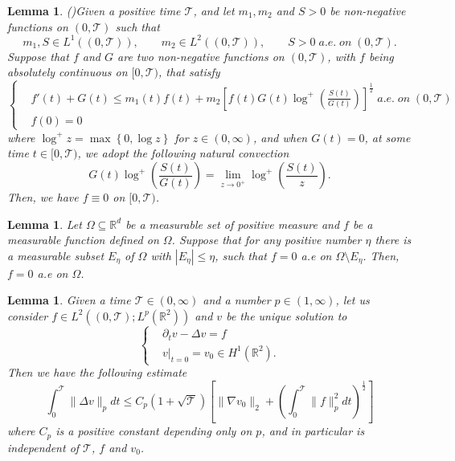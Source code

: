 \documentclass[11pt, a4paper, article,reqno,]{amsart}
\newtheorem{lemma}[theorem]{Lemma}
\theoremstyle{remark}
\numberwithin{equation}{section}
\begin{document}
\begin{lemma}(\cite{LT})\label{lemma_uniqueness}
    Given a positive time $\mathcal{T}$, and let $m_1,m_2$ and $S>0$ be non-negative functions on $(0,\mathcal{T})$ such that
    \begin{equation*}
        m_1, S \in L^1((0,\mathcal{T})), \qquad m_2 \in L^2((0,\mathcal{T})), \qquad S>0 \; a.e. \; on \; (0,\mathcal{T}).
    \end{equation*}
    Suppose that $f$ and $G$ are two non-negative functions on $(0,\mathcal{T})$, with $f$ being absolutely continuous on $[0,\mathcal{T})$, that satisfy
    \begin{equation*}
         \left\{ \begin{aligned}
             & f'(t) + G(t) \leq m_1(t)f(t) + m_2\left[f(t) G(t) \log^+ \left( \frac{S(t)}{G(t)}\right) \right]^{\frac{1}{2}} \; a.e. \; on \; (0,\mathcal{T}) \\
             &f(0)=0
         \end{aligned} \right.
    \end{equation*}
    where $\log^+z = \max\left\{0, \log z\right\}$ for $z \in (0,\infty)$, and when $G(t)=0$, at some time $t \in [0,\mathcal{T})$, we adopt the following natural convection
    \begin{equation}
        G(t)\log^+ \left( \frac{S(t)}{G(t)} \right) = \lim_{z \rightarrow0^+}\log^+ \left( \frac{S(t)}{z}\right).
    \end{equation}
    Then, we have $f \equiv 0$ on $[0,\mathcal{T})$.
\end{lemma}

\begin{lemma}\label{egoroff}
    Let $\Omega \subseteq \mathbb{R}^d$ be a measurable set of positive measure and $f$ be a measurable function defined on $\Omega$. Suppose that for any positive number $\eta$ there is a measurable subset $E_\eta$ of $\Omega$ with $|E_\eta| \leq \eta$, such that $f=0$ a.e on $\Omega \setminus E_\eta$. Then, $f=0$ a.e on $\Omega$.
\end{lemma}

\begin{lemma}\label{A3}
Given a time $\mathcal{T} \in (0,\infty)$ and a number $p \in (1, \infty)$, let us consider $f \in L^2((0,\mathcal{T});L^p(\mathbb{R}^2))$ and $v$ be the unique solution to
\begin{equation*}
    \left\{ \begin{aligned}
        & \partial_t v - \Delta v = f \\
        & v|_{t=0} = v_0 \in H^1(\mathbb{R}^2).
    \end{aligned} \right.
\end{equation*}
Then we have the following estimate
\begin{equation*}
    \int_0^\mathcal{T} \|\Delta v\|_p dt \leq C_p( 1 + \sqrt{\mathcal{T}}) \left[ \|\nabla v_0\|_2 + \left( \int_0^\mathcal{T} \|f\|_p^2 dt\right)^{\frac{1}{2}} \right]
\end{equation*}
where $C_p$ is a positive constant depending only on $p$, and in particular is independent of $\mathcal{T}$, $f$ and $v_0$.
\end{lemma}
\end{document}
